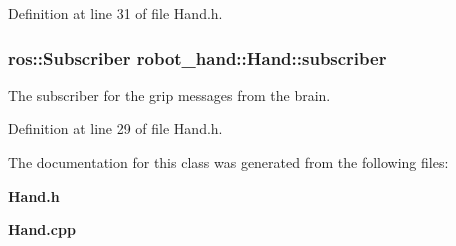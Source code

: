 Definition at line 31 of file Hand.\-h.

\subsubsection[{subscriber}]{\setlength{\rightskip}{0pt plus 5cm}ros\-::\-Subscriber robot\-\_\-hand\-::\-Hand\-::subscriber\hspace{0.3cm}{\ttfamily [protected]}}\label{classrobot__hand_1_1Hand_a946aedc54fbdb3752ed8d2f7795b0fa9}


The subscriber for the grip messages from the brain. 



Definition at line 29 of file Hand.\-h.



The documentation for this class was generated from the following files\-:\begin{DoxyCompactItemize}
\item 
{\bf Hand.\-h}\item 
{\bf Hand.\-cpp}\end{DoxyCompactItemize}
